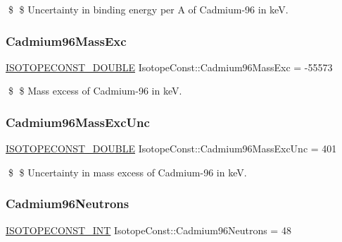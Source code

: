 \$ \$ Uncertainty in binding energy per A of Cadmium-\/96 in keV. \mbox{\label{group___isotope_const-_cadmium-_cd96_ga45b7a2f109ee2d2ed3d6bf7e5528b1cb}} 
\subsubsection{\texorpdfstring{Cadmium96\+Mass\+Exc}{Cadmium96MassExc}}
{\footnotesize\ttfamily \mbox{\hyperlink{group___isotope_const-_macros_ga8f45a7272ce02c0b4c65c44636ed719a}{I\+S\+O\+T\+O\+P\+E\+C\+O\+N\+S\+T\+\_\+\+D\+O\+U\+B\+LE}} Isotope\+Const\+::\+Cadmium96\+Mass\+Exc = -\/55573}

\$ \$ Mass excess of Cadmium-\/96 in keV. \mbox{\label{group___isotope_const-_cadmium-_cd96_ga27834e53a70fff11e4189fd70db83f04}} 
\subsubsection{\texorpdfstring{Cadmium96\+Mass\+Exc\+Unc}{Cadmium96MassExcUnc}}
{\footnotesize\ttfamily \mbox{\hyperlink{group___isotope_const-_macros_ga8f45a7272ce02c0b4c65c44636ed719a}{I\+S\+O\+T\+O\+P\+E\+C\+O\+N\+S\+T\+\_\+\+D\+O\+U\+B\+LE}} Isotope\+Const\+::\+Cadmium96\+Mass\+Exc\+Unc = 401}

\$ \$ Uncertainty in mass excess of Cadmium-\/96 in keV. \mbox{\label{group___isotope_const-_cadmium-_cd96_ga043b97266b21b38edf716acc4b9ef953}} 
\subsubsection{\texorpdfstring{Cadmium96\+Neutrons}{Cadmium96Neutrons}}
{\footnotesize\ttfamily \mbox{\hyperlink{group___isotope_const-_macros_ga5f18360b3e99483a35c32d789e62621c}{I\+S\+O\+T\+O\+P\+E\+C\+O\+N\+S\+T\+\_\+\+I\+NT}} Isotope\+Const\+::\+Cadmium96\+Neutrons = 48}

